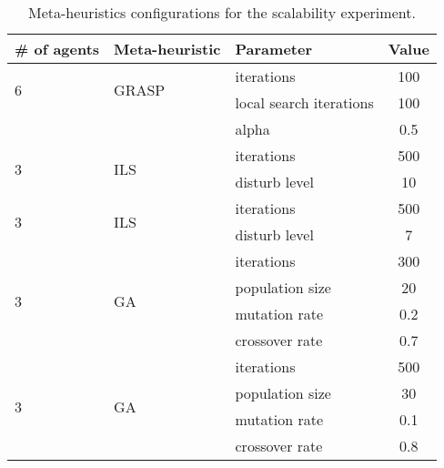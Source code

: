 \documentclass[preprint,12pt]{elsarticle}
\begin{document}
\begin{table*}
\centering
\caption{Meta-heuristics configurations for the scalability experiment.}

\begin{tabular}{lllc}
    \toprule
    \textbf{\# of agents}  & \textbf{Meta-heuristic}   & \textbf{Parameter}        & \textbf{Value} \\
    \midrule
    \multirow{2}{*}{6}      & \multirow{2}{*}{GRASP}    & iterations                 & 100\\
                            &                           & local search iterations    & 100\\
                            &                           & alpha                      & 0.5\\
    \midrule
    \multirow{2}{*}{3}      & \multirow{2}{*}{ILS}      & iterations                 & 500\\
                            &                           & disturb level              & 10\\
    \midrule
    \multirow{2}{*}{3}      & \multirow{2}{*}{ILS}      & iterations                 & 500\\
                            &                           & disturb level              & 7\\
    \midrule
    \multirow{4}{*}{3}      & \multirow{4}{*}{GA}       & iterations                & 300\\
                            &                           & population size           & 20\\
                            &                           & mutation rate             & 0.2\\
                            &                           & crossover rate            & 0.7\\
    \midrule
    \multirow{4}{*}{3}      & \multirow{4}{*}{GA}       & iterations                & 500\\
                            &                           & population size           & 30\\
                            &                           & mutation rate             & 0.1\\
                            &                           & crossover rate            & 0.8\\
    \bottomrule
\end{tabular}
\label{tab:exp_config}
\end{table*}
\end{document}
